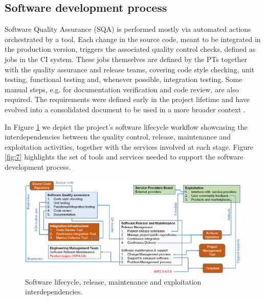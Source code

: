 \documentclass{article}
\begin{document}


\subsection{Software development process}


Software Quality Assurance (SQA) is performed mostly via automated actions orchestrated by a tool. Each change in the source code,
meant to be integrated in the production version, triggers the associated quality control checks, defined as jobs in the CI system. These jobs
themselves are defined by the PTs together with the quality assurance and
release teams, covering code style checking, unit testing, functional testing and, whenever possible, integration testing.
Some manual steps, e.g. for documentation verification and code review, are also required. The requirements were defined early in the
project lifetime and have evolved into a consolidated document to be
used in a more broader context \cite{SQA}.

 In Figure \ref{fig:6} we depict the project's software
 lifecycle workflow showcasing the interdependencies between
 the quality control, release, maintenance and exploitation activities, together
 with the services involved at each stage. Figure \ref{fig:7} highlights the set of tools and services needed to support the software development process.


 \begin{figure}[h]
   \centering
   \includegraphics[width=\textwidth]{./figs/Figure6.pdf}
   \caption{Software lifecycle, release, maintenance and exploitation interdependencies.}
   \label{fig:6}
 \end{figure}
\end{document}

